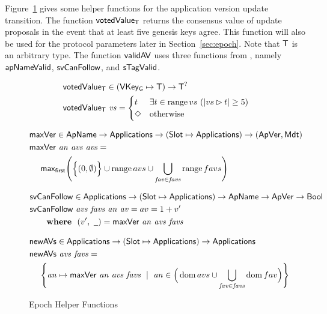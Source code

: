 \clearpage

Figure~\ref{fig:funcs:helper-updates} gives some helper functions for the
application version update transition.
The function $\mathsf{votedValue_T}$ returns
the consensus value of update proposals in the event that at least five
genesis keys agree.
This function will also be used for the protocol parameters later in Section~\ref{sec:epoch}.
Note that $\mathsf{T}$ is an arbitrary type.
The function $\mathsf{validAV}$ uses three functions from \cite{byron_ledger_spec}, namely
$\mathsf{apNameValid}$, $\mathsf{svCanFollow}$, and $\mathsf{sTagValid}$.

\begin{figure}[htb]
  \begin{align*}
      & \mathsf{votedValue_T} \in (\mathsf{VKey_G}\mapsto\mathsf{T}) \to \mathsf{T}^?\\
      & \mathsf{votedValue_T}~\mathit{vs} =
        \begin{cases}
          t & \exists t\in\operatorname{range}{vs}~(|vs\rhd t|\geq 5) \\
          \Diamond & \text{otherwise} \\
        \end{cases}
  \end{align*}

  \begin{align*}
      & \mathsf{maxVer} \in \mathsf{ApName} \to \mathsf{Applications} \to (\mathsf{Slot}\mapsto\mathsf{Applications})
        \to (\mathsf{ApVer}, \mathsf{Mdt})\\
      & \mathsf{maxVer}~\mathit{an}~\mathit{avs}~\mathit{avs} = \\
      & ~~~~\mathsf{max_{first}} \Bigg(
        \Big\{(0, \emptyset)\Big\}
        \cup
        \operatorname{range}{avs}
        \cup
        \bigcup_{\mathit{fav}\in\mathit{favs}}
        \operatorname{range}{favs}
        \Bigg)
  \end{align*}

  \begin{align*}
      & \fun{svCanFollow} \in \Applications \to (\Slot\mapsto\Applications)
        \to \ApName \to \ApVer \to \Bool\\
      & \fun{svCanFollow}~\var{avs}~\var{favs}~\var{an}~\var{av}= av = 1 + v' \\
      & ~~~~\where (v',~\wcard) = \fun{maxVer}~\var{an}~\var{avs}~\var{favs}
  \end{align*}

  \begin{align*}
      & \mathsf{newAVs} \in \mathsf{Applications} \to (\mathsf{Slot}\mapsto\mathsf{Applications}) \to \mathsf{Applications} \\
      & \mathsf{newAVs}~\mathit{avs}~\mathit{favs} = \\
      & ~~~~\Bigg\{\mathit{an}\mapsto\mathsf{maxVer}~\mathit{an}~\mathit{avs}~\mathit{favs}
            ~\mid~
            \mathit{an}\in\Big(\operatorname{dom}{avs}\cup\bigcup_{\mathit{fav}\in\mathit{favs}}\operatorname{dom}{fav}\Big)
            \Bigg\}
  \end{align*}

  \caption{Epoch Helper Functions}
  \label{fig:funcs:helper-updates}
\end{figure}



